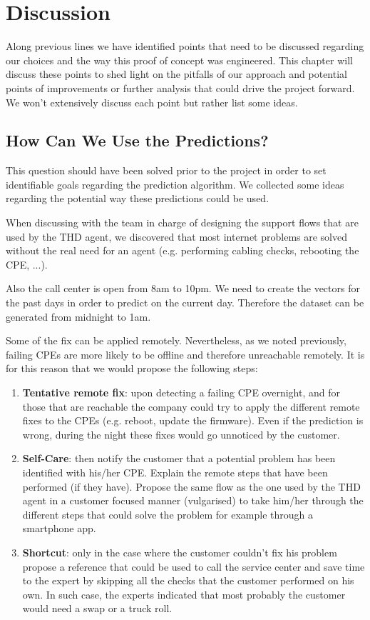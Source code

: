 \chapter{Discussion}
\label{chap:discussion}
Along previous lines we have identified points that need to be discussed regarding our choices and the way this proof of concept was engineered. This chapter will discuss these points to shed light on the pitfalls of our approach and potential points of improvements or further analysis that could drive the project forward. We won't extensively discuss each point but rather list some ideas.

\section{How Can We Use the Predictions?}
This question should have been solved prior to the project in order to set identifiable goals regarding the prediction algorithm. We collected some ideas regarding the potential way these predictions could be used.

When discussing with the team in charge of designing the support flows that are used by the THD agent, we discovered that most internet problems are solved without the real need for an agent (e.g. performing cabling checks, rebooting the CPE, ...). 

Also the call center is open from 8am to 10pm. We need to create the vectors for the past days in order to predict on the current day. Therefore the dataset can be generated from midnight to 1am. 

Some of the fix can be applied remotely. Nevertheless, as we noted previously, failing CPEs are more likely to be offline and therefore unreachable remotely. It is for this reason that we would propose the following steps:
\begin{enumerate}
	\item \textbf{Tentative remote fix}: upon detecting a failing CPE overnight, and for those that are reachable the company could try to apply the different remote fixes to the CPEs (e.g. reboot, update the firmware). Even if the prediction is wrong, during the night these fixes would go unnoticed by the customer. 
	\item \textbf{Self-Care}: then notify the customer that a potential problem has been identified with his/her CPE. Explain the remote steps that have been performed (if they have). Propose the same flow as the one used by the THD agent in a customer focused manner (vulgarised) to take him/her through the different steps that could solve the problem for example through a smartphone app. 
	\item \textbf{Shortcut}: only in the case where the customer couldn't fix his problem propose a reference that could be used to call the service center and save time to the expert by skipping all the checks that the customer performed on his own. In such case, the experts indicated that most probably the customer would need a swap or a truck roll.
\end{enumerate}

